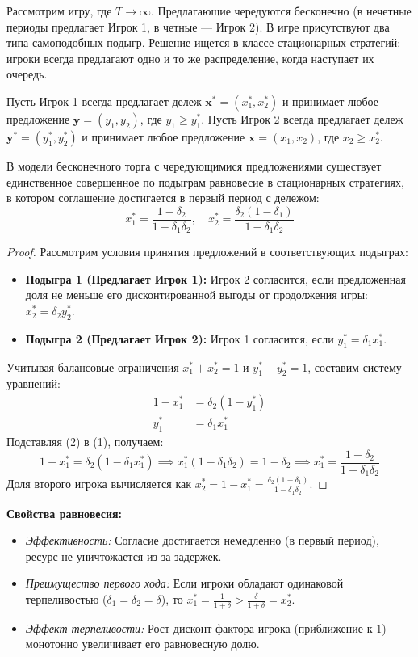 Рассмотрим игру, где $T \to \infty$. Предлагающие чередуются бесконечно (в нечетные периоды предлагает Игрок 1, в четные — Игрок 2). В игре присутствуют два типа самоподобных подыгр. Решение ищется в классе стационарных стратегий: игроки всегда предлагают одно и то же распределение, когда наступает их очередь.

Пусть Игрок 1 всегда предлагает дележ $\mathbf{x}^* = (x_1^*, x_2^*)$ и принимает любое предложение $\mathbf{y} = (y_1, y_2)$, где $y_1 \ge y_1^*$. 
Пусть Игрок 2 всегда предлагает дележ $\mathbf{y}^* = (y_1^*, y_2^*)$ и принимает любое предложение $\mathbf{x} = (x_1, x_2)$, где $x_2 \ge x_2^*$.

\begin{theorem}
В модели бесконечного торга с чередующимися предложениями существует единственное совершенное по подыграм равновесие в стационарных стратегиях, в котором соглашение достигается в первый период с дележом:
\begin{equation}
    x_1^* = \frac{1 - \delta_2}{1 - \delta_1 \delta_2}, \quad x_2^* = \frac{\delta_2(1 - \delta_1)}{1 - \delta_1 \delta_2}
\end{equation}
\end{theorem}

\begin{proof}
Рассмотрим условия принятия предложений в соответствующих подыграх:
\begin{itemize}
    \item \textbf{Подыгра 1 (Предлагает Игрок 1):} Игрок 2 согласится, если предложенная доля не меньше его дисконтированной выгоды от продолжения игры: $x_2^* = \delta_2 y_2^*$.
    \item \textbf{Подыгра 2 (Предлагает Игрок 2):} Игрок 1 согласится, если $y_1^* = \delta_1 x_1^*$.
\end{itemize}
Учитывая балансовые ограничения $x_1^* + x_2^* = 1$ и $y_1^* + y_2^* = 1$, составим систему уравнений:
\begin{align}
    1 - x_1^* &= \delta_2 (1 - y_1^*) \\
    y_1^* &= \delta_1 x_1^*
\end{align}
Подставляя (2) в (1), получаем:
\[
    1 - x_1^* = \delta_2 (1 - \delta_1 x_1^*) \implies x_1^* (1 - \delta_1 \delta_2) = 1 - \delta_2 \implies x_1^* = \frac{1 - \delta_2}{1 - \delta_1 \delta_2}
\]
Доля второго игрока вычисляется как $x_2^* = 1 - x_1^* = \frac{\delta_2(1 - \delta_1)}{1 - \delta_1 \delta_2}$.
\end{proof}

\textbf{Свойства равновесия:}
\begin{itemize}
    \item \textit{Эффективность:} Согласие достигается немедленно (в первый период), ресурс не уничтожается из-за задержек.
    \item \textit{Преимущество первого хода:} Если игроки обладают одинаковой терпеливостью ($\delta_1 = \delta_2 = \delta$), то $x_1^* = \frac{1}{1 + \delta} > \frac{\delta}{1 + \delta} = x_2^*$.
    \item \textit{Эффект терпеливости:} Рост дисконт-фактора игрока (приближение к $1$) монотонно увеличивает его равновесную долю.
\end{itemize}

